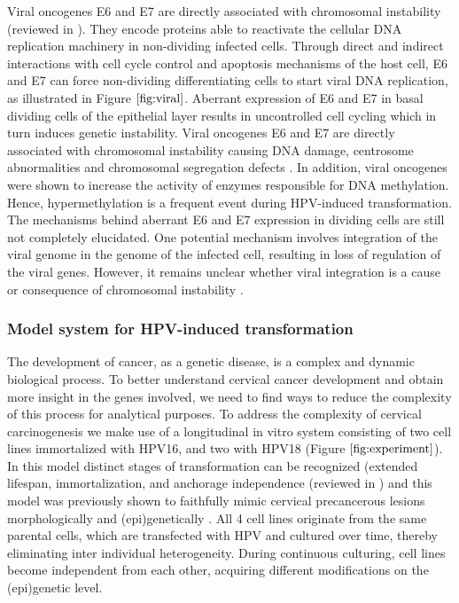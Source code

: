 Viral oncogenes E6 and E7 are directly associated with chromosomal instability (reviewed in \cite{Wilting2016}). They encode proteins able to reactivate the cellular DNA replication machinery in non-dividing infected cells. Through direct and indirect interactions with cell cycle control and apoptosis mechanisms of the host cell, E6 and E7 can force non-dividing differentiating cells to start viral DNA replication, as illustrated in Figure $\ref{fig:viral}$. Aberrant expression of E6 and E7 in basal dividing cells of the epithelial layer results in uncontrolled cell cycling which in turn induces genetic instability. Viral oncogenes E6 and E7 are directly associated with chromosomal instability causing DNA damage, centrosome abnormalities and chromosomal segregation defects \cite{Duensing2004, Moody2010}. In addition, viral oncogenes were shown to increase the activity of enzymes responsible for DNA methylation. Hence, hypermethylation is a  frequent event during HPV-induced transformation.  The mechanisms behind aberrant E6 and E7 expression in dividing cells are still not completely elucidated. One potential mechanism involves integration of the viral genome in the genome of the infected cell, resulting in loss of regulation of the viral genes. However,  it remains unclear whether viral integration is a cause or consequence of chromosomal instability \cite{Pett2004}.

\subsubsection{Model system for HPV-induced transformation}

The development of cancer, as a genetic disease, is a complex and dynamic biological process. To better understand cervical cancer development and obtain more insight in the genes involved, we need to find ways to reduce the complexity of this process for analytical purposes. To address the complexity of cervical carcinogenesis we make use of a longitudinal in vitro system consisting of two cell lines immortalized with HPV16, and two with HPV18 (Figure $\ref{fig:experiment}$). In this model distinct stages of transformation can be recognized (extended lifespan, immortalization, and anchorage independence (reviewed in \cite{Steenbergen2005}) and this model was previously shown to faithfully mimic cervical precancerous lesions morphologically and (epi)genetically \cite{Steenbergen2004, Wilting2006, Henken2007}. All 4 cell lines originate from the same parental cells, which are transfected with HPV and cultured over time, thereby eliminating inter individual heterogeneity. During continuous culturing, cell lines become independent from each other, acquiring different modifications on the (epi)genetic level. 

